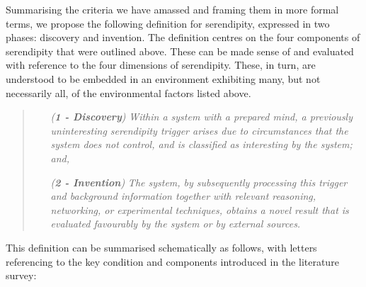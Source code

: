 Summarising the criteria we have amassed and framing them in more
formal terms, we propose the following definition for serendipity,
expressed in two phases: discovery and invention.  The definition
centres on the four components of serendipity that were outlined
above.  These can be made sense of and evaluated with reference to the
four dimensions of serendipity.  These, in turn, are understood to be
embedded in an environment exhibiting many, but not necessarily all,
of the environmental factors listed above.

\begin{quote}
\begin{enumerate}[itemsep=2pt,labelwidth=9em,leftmargin=9em,rightmargin=2em]
\item[\emph{(\textbf{1 - Discovery})}] \emph{Within a system with a prepared mind, a previously uninteresting serendipity trigger arises due to circumstances that the system does not control, and is classified as interesting by the system; and,}
\item[\emph{(\textbf{2 - Invention})}] \emph{The system, by subsequently processing this trigger and background information together with relevant reasoning, networking, or experimental techniques, obtains a novel result that is evaluated favourably by the system or by external sources.}
\end{enumerate}
\end{quote}

\noindent This definition can be summarised schematically as follows, with letters referencing to the key condition and components introduced in the literature survey: 

{\centering

\par}

